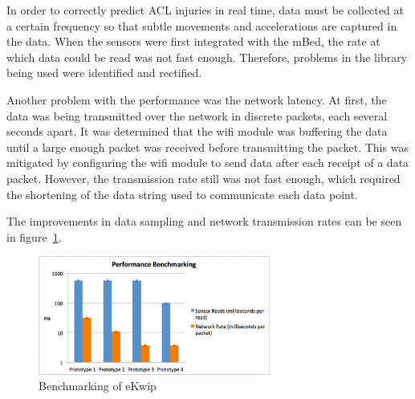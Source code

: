 In order to correctly predict ACL injuries in real time, data must be collected at a certain frequency so that subtle movements and accelerations are captured in the data. When the sensors were first integrated with the mBed, the rate at which data could be read was not fast enough. Therefore, problems in the library being used were identified and rectified.

Another problem with the performance was the network latency. At first, the data was being transmitted over the network in discrete packets, each several seconds apart. It was determined that the wifi module was buffering the data until a large enough packet was received before transmitting the packet. This was mitigated by configuring the wifi module to send data after each receipt of a data packet. However, the transmission rate still was not fast enough, which required the shortening of the data string used to communicate each data point.

The improvements in data sampling and network transmission rates can be seen in figure~\ref{fig:graph}.

\begin{figure}[h]
  \begin{center}
    \includegraphics[width=3in]{images/graph.png}
  \end{center}
  \caption{Benchmarking of eKwip}
  \label{fig:graph}
\end{figure}
